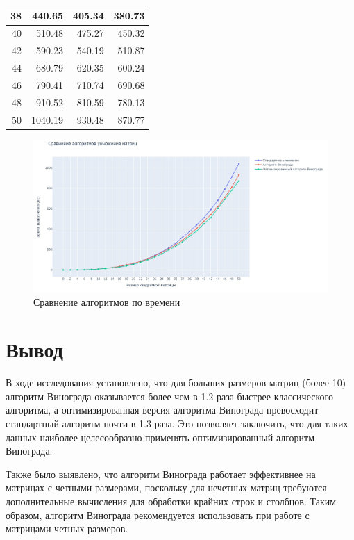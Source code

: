 \begin{table}[h]
\begin{center}
\begin{threeparttable}
\begin{tabular}{|r|r|r|r|}
                \hline
                38 & 440.65 & 405.34 & 380.73 \\
                \hline
                40 & 510.48 & 475.27 & 450.32 \\
                \hline
                42 & 590.23 & 540.19 & 510.87 \\
                \hline
                44 & 680.79 & 620.35 & 600.24 \\
                \hline
                46 & 790.41 & 710.74 & 690.68 \\
                \hline
                48 & 910.52 & 810.59 & 780.13 \\
                \hline
                50 & 1040.19 & 930.48 & 870.77 \\
                \hline
            \end{tabular}
        \end{threeparttable}
    \end{center}
\end{table}

\begin{figure}[H]
    \centering
    \includegraphics[width=1\linewidth]{images/plots/plot.jpg}
    \caption{Сравнение алгоритмов по времени}
    \label{fig:time_mes}
\end{figure}

\clearpage

\section{Вывод}

В ходе исследования установлено, что для больших размеров матриц (более 10) алгоритм Винограда оказывается более чем в 1.2 раза быстрее классического алгоритма, а оптимизированная версия алгоритма Винограда превосходит стандартный алгоритм почти в 1.3 раза. Это позволяет заключить, что для таких данных наиболее целесообразно применять оптимизированный алгоритм Винограда.

Также было выявлено, что алгоритм Винограда работает эффективнее на матрицах с четными размерами, поскольку для нечетных матриц требуются дополнительные вычисления для обработки крайних строк и столбцов. Таким образом, алгоритм Винограда рекомендуется использовать при работе с матрицами четных размеров.
